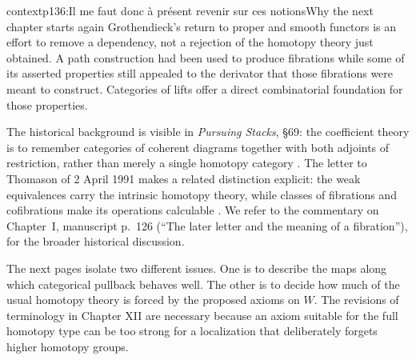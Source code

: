 \begin{dcomment}{context}{p136:Il me faut donc à présent revenir sur ces notions}{Why the next chapter starts again}
Grothendieck's return to proper and smooth functors is an effort to remove a dependency, not a rejection of the homotopy theory just obtained. A path construction had been used to produce fibrations while some of its asserted properties still appealed to the derivator that those fibrations were meant to construct. Categories of lifts offer a direct combinatorial foundation for those properties.

The historical background is visible in \emph{Pursuing Stacks}, \S69: the coefficient theory is to remember categories of coherent diagrams together with both adjoints of restriction, rather than merely a single homotopy category \citep{Grothendieck1983}. The letter to Thomason of 2 April 1991 makes a related distinction explicit: the weak equivalences carry the intrinsic homotopy theory, while classes of fibrations and cofibrations make its operations calculable \citep[\S1]{Grothendieck1991Letter}. We refer to the commentary on Chapter~I, manuscript p.~126 (“The later letter and the meaning of a fibration”), for the broader historical discussion.

The next pages isolate two different issues. One is to describe the maps along which categorical pullback behaves well. The other is to decide how much of the usual homotopy theory is forced by the proposed axioms on \(W\). The revisions of terminology in Chapter XII are necessary because an axiom suitable for the full homotopy type can be too strong for a localization that deliberately forgets higher homotopy groups.
\end{dcomment}

